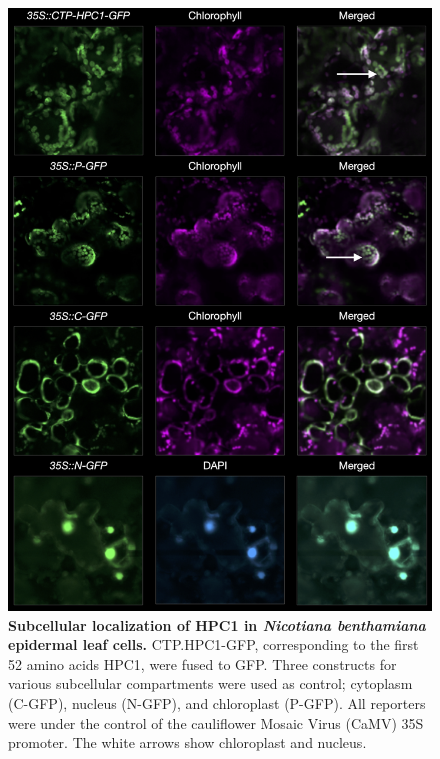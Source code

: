 \begin{subappendices}
\begin{figure}[t]
\begin{center}
\includegraphics[width=0.8\linewidth]{Sup_Figures/Sup_Fig_5.png}
\caption[Subcellular localization of HPC1 in \textit{Nicotiana benthamiana} epidermal leaf cells.]{\textbf{Subcellular localization of HPC1 in \textit{Nicotiana benthamiana} epidermal leaf cells.}   
CTP.HPC1-GFP, corresponding to the first 52 amino acids HPC1, were fused to GFP. 
Three constructs for various subcellular compartments were used as control; cytoplasm (C-GFP), nucleus (N-GFP), and chloroplast (P-GFP). All reporters were under the control of the cauliflower Mosaic Virus (CaMV) 35S promoter. The white arrows show chloroplast and nucleus.
} 
\label{figure:Sup:HPC1_organelle}
\end{center}
\end{figure} 
\clearpage


\end{subappendices}
